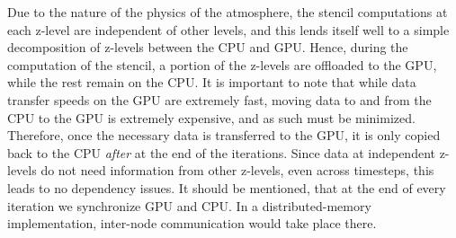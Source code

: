 Due to the nature of the physics of the atmosphere, the stencil computations at each z-level are independent of other levels, and this lends itself well to a simple decomposition of z-levels between the CPU and GPU.
Hence, during the computation of the stencil, a portion of the z-levels are offloaded to the GPU, while the rest remain on the CPU.
It is important to note that while data transfer speeds on the GPU are extremely fast, moving data to and from the CPU to the GPU is extremely expensive, and as such must be minimized. 
Therefore, once the necessary data is transferred to the GPU, it is only copied back to the CPU \textit{after} at the end of the iterations.
Since data at independent z-levels do not need information from other z-levels, even across timesteps, this leads to no dependency issues.
It should be mentioned, that at the end of every iteration we synchronize GPU and CPU.
In a distributed-memory implementation, inter-node communication would take place there.